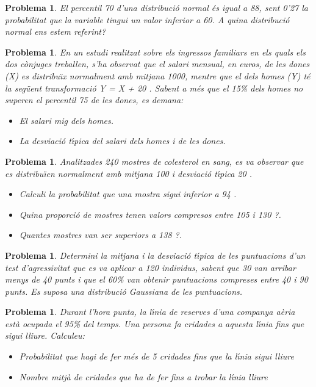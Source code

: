\documentclass[11pt]{article}
\newcounter{prbcont}
\newtheorem{problema}[prbcont]{Problema}
\begin{document}
\begin{problema}
El percentil 70 d'una distribuci\'o normal \'es igual a 88, sent 0'27 la probabilitat que la variable tingui un valor inferior a 60. A quina distribuci\'o normal ens estem referint?
\end{problema}

\begin{problema}
En un estudi realitzat sobre els ingressos familiars en els quals els dos c\`onjuges treballen, s'ha observat que el salari mensual, en euros, de les dones (X) es distribu\"{\i}x normalment amb mitjana 1000, mentre que el dels homes (Y) t\'e la seg\"uent transformaci\'o Y = X + 20 . Sabent a m\'es que el 15\% dels homes no superen el percentil 75 de les dones, es demana: 
\begin{itemize}
\item El salari mig dels homes. 
\item La desviaci\'o t\'{\i}pica del salari dels homes i de les dones. 
\end{itemize}
\end{problema}

\begin{problema}
Analitzades 240 mostres de colesterol en sang, es va observar que es distribu\"{\i}en normalment amb mitjana 100 i desviaci\'o t\'{\i}pica 20 . 
\begin{itemize}
\item Calculi la probabilitat que una mostra sigui inferior a 94 . 
\item Quina proporci\'o de mostres tenen valors compresos entre 105 i 130 ?. 
\item Quantes mostres van ser superiors a 138 ?. 
\end{itemize}
\end{problema}

\begin{problema}
Determini la mitjana i la desviaci\'o t\'{\i}pica de les puntuacions d'un test d'agressivitat que es va aplicar a 120 individus, sabent que 30 van arribar menys de 40 punts i que el 60\% van obtenir puntuacions compreses entre 40 i 90 punts.  Es suposa una distribuci\'o Gaussiana de les puntuacions.
\end{problema}

\begin{problema}
Durant l'hora punta, la l\'{\i}nia de reserves d'una companya a\`eria est\`a ocupada el 95\%
del temps. Una persona fa cridades a aquesta l\'{\i}nia fins que sigui lliure. Calculeu:
\begin{itemize}
\item [(a)] Probabilitat que hagi de fer m\'es de 5 cridades fins que la l\'{\i}nia sigui lliure
\item [(b)] Nombre mitj\`a de cridades que ha de fer fins a trobar la l\'{\i}nia lliure
\end{itemize}
\end{problema}
\end{document}
